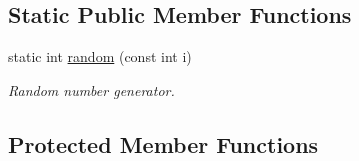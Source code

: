 \subsection*{Static Public Member Functions}
\begin{DoxyCompactItemize}
\item 
static int \hyperlink{classperlin__if_af846fefa8cb40e741296c12521ec5508}{random} (const int i)
\begin{DoxyCompactList}\small\item\em Random number generator. \end{DoxyCompactList}\end{DoxyCompactItemize}
\subsection*{Protected Member Functions}
